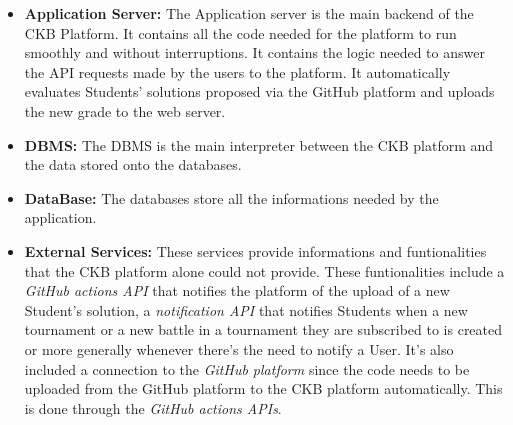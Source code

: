 \documentclass{article}
\begin{document}
{\begin{itemize}
        It is the main container for the JavaScript and general backend code for the platform.
        The Web server is connected to the Application server because it needs to be automatically
        updated when new grades for Students' solutions are generated by the platform.\\
        \item \textbf{Application Server:} The Application server is the main backend of the CKB Platform. 
        It contains all the code needed for the platform to run smoothly and without interruptions. 
        It contains the logic needed to answer the API requests made by the users to the platform. It
        automatically evaluates Students' solutions proposed via the GitHub platform and uploads the 
        new grade to the web server.\\
        \item \textbf{DBMS:} The DBMS is the main interpreter between the CKB platform and the data 
        stored onto the databases.\\
        \item \textbf{DataBase:} The databases store all the informations needed by the application.\\
        \item \textbf{External Services:} These services provide informations and funtionalities that 
        the CKB platform alone could not provide.
        These funtionalities include a \textit{GitHub actions API} that notifies the platform of the 
        upload of a new Student's solution, a \textit{notification API} that notifies Students when a new 
        tournament or a new battle in a tournament they are subscribed to is created or more generally
        whenever there's the need to notify a User. It's also included a connection to the 
        \textit{GitHub platform} since the code needs to be uploaded from the GitHub platform to the 
        CKB platform automatically. This is done through the \textit{GitHub actions APIs}.
    \end{itemize}
}
\end{document}
